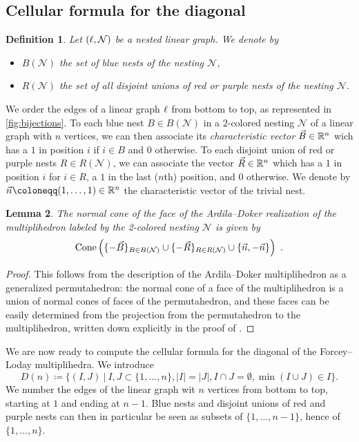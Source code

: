 \documentclass[twoside, 11pt]{amsart}
\newtheorem{definition}{Definition}[section]
\newtheorem{lemma}[definition]{Lemma}
\theoremstyle{remark}
\begin{document}
\subsection{Cellular formula for the diagonal} \label{ss:cellular-formula}

\begin{definition}
Let $(\ell,\mathcal{N})$ be a nested linear graph. We denote by 
\begin{itemize}[leftmargin=*]
  \item $B(\mathcal{N})$ the set of blue nests of the nesting $\mathcal{N}$,
  \item $R(\mathcal{N})$ the set of all disjoint \emph{unions} of red or purple nests of the nesting $\mathcal{N}$.
\end{itemize}
\end{definition}

We order the edges of a linear graph $\ell$ from bottom to top, as represented in \cref{fig:bijections}. 
To each blue nest $B \in B(\mathcal{N})$ in a 2-colored nesting $\mathcal{N}$ of a linear graph with $n$ vertices, we can then associate its \emph{characteristic vector} $\vec B\in \mathbb{R}^n$ wich has a $1$ in position $i$ if $i \in B$ and $0$ otherwise.
To each disjoint union of red or purple nests $R \in R(\mathcal{N})$, we can associate the vector $\vec R \in \mathbb{R}^n$ which has a $1$ in position $i$ for $i \in R$, a $1$ in the last ($n$th) position, and $0$ otherwise. 
We denote by $\vec n \coloneqq (1,\ldots,1) \in \RR^n$ the characteristic vector of the trivial nest.

\begin{lemma} 
\label{lemma:normalcones}
The normal cone of the face of the Ardila--Doker realization of the multiplihedron labeled by the 2-colored nesting $\mathcal{N}$ is given by \[\operatorname{Cone}\left(\{-\vec B\}_{B \in B(\mathcal{N})} \cup \{-\vec R\}_{R \in R(\mathcal{N})} \cup \{\vec n, - \vec n\} \right) \ . \]
\end{lemma} 

\begin{proof} 
This follows from the description of the Ardila--Doker multiplihedron as a generalized permutahedron: 
the normal cone of a face of the multiplihedron is a union of normal cones of faces of the permutahedron, and these faces can be easily determined from the projection from the permutahedron to the multiplihedron, written down explicitly in the proof of \cite[Theorem 3.3.6]{Doker11}.
\end{proof}

We are now ready to compute the cellular formula for the diagonal of the Forcey--Loday multiplihedra. We introduce \[ D(n)\coloneqq \{(I,J) \ | \ I,J\subset\{1,\ldots,n\}, |I|=|J|, I\cap J=\emptyset, \min(I\cup J)\in I \}. \]
We number the edges of the linear graph wit $n$ vertices from bottom to top, starting at $1$ and ending at $n-1$. 
Blue nests and disjoint unions of red and purple nests can then in particular be seen as subsets of $\{1,\ldots,n-1\}$, hence of $\{1,\ldots,n\}$.
\end{document}
